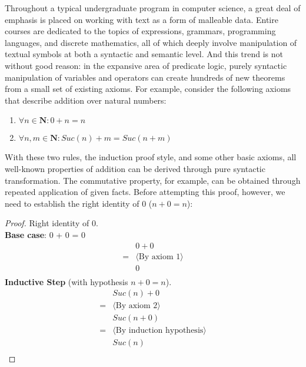 \documentclass{article}
\begin{document}
Throughout a typical undergraduate program in computer science, a great deal of emphasis is placed on working with text as a form of malleable data.
Entire courses are dedicated to the topics of expressions, grammars, programming languages, and discrete mathematics, all of which
deeply involve manipulation of textual symbols at both a syntactic and semantic level.
And this trend is not without good reason: in the expansive area of predicate logic,
purely syntactic manipulation of variables and operators can create hundreds of new theorems from a small set of existing axioms.
For example, consider the following axioms that describe addition over natural numbers:
\begin{enumerate}
    \item $\forall n \in \mathbf{N}: 0 + n = n$
    \item $\forall n,m \in \mathbf{N}: Suc(n) + m = Suc(n + m)$
\end{enumerate}
With these two rules, the induction proof style, and some other basic axioms,
all well-known properties of addition can be derived through pure syntactic transformation.
The commutative property, for example, can be obtained through repeated application of given facts.
Before attempting this proof, however, we need to establish the right identity of 0 ($n + 0 = n$):
\begin{proof}
    Right identity of 0.
    \\
    \textbf{Base case}: 0 + 0 = 0
    \begin{align*}
        &0 + 0\\
        = &\langle \text{By axiom 1} \rangle \\
        &0\\
    \end{align*}
    \textbf{Inductive Step} (with hypothesis $n + 0 = n$).
    \begin{align*}
        &Suc(n) + 0\\
        = &\langle \text{By axiom 2} \rangle \\
        &Suc(n + 0)\\
        = &\langle \text{By induction hypothesis} \rangle \\
        &Suc(n)\\
    \end{align*}
\end{proof}
\end{document}
